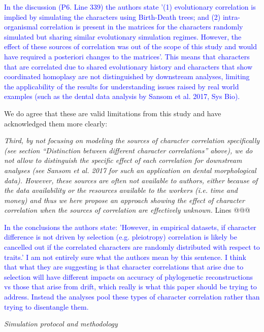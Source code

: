 \documentclass[12pt,letterpaper]{article}
\renewcommand{\subsection}[1]{%
\bigskip
\begin{center}
\begin{large}
\normalfont\itshape #1
\end{large}
\end{center}}
\begin{document}
\textcolor{blue}{In the discussion (P6. Line 339) the authors state '(1) evolutionary correlation is implied by simulating the characters using Birth-Death trees; and (2) intra-organismal correlation is present in the matrices for the characters randomly simulated but sharing similar evolutionary simulation regimes.  However, the effect of these sources of correlation was out of the scope of this study and would have required a posteriori changes to the matrices'. This means that characters that are correlated due to shared evolutionary history and characters that show coordinated homoplasy are not distinguished by downstream analyses, limiting the applicability of the results for understanding issues raised by real world examples (such as the dental data analysis by Sansom et al. 2017, Sys Bio).}

We do agree that these are valid limitations from this study and have acknowledged them more clearly:

\textit{Third, by not focusing on modeling the sources of character correlation specifically (see section “Distinction between different character correlations” above), we do not allow to distinguish the specific effect of each correlation for downstream analyses (see Sansom et al. 2017 for such an application on dental morphological data). However, these sources are often not available to authors, either because of the data availability or the resources available to the workers (i.e. time and money) and thus we here propose an approach showing the effect of character correlation when the sources of correlation are effectively unknown.} Lines @@@


\textcolor{blue}{In the conclusions the authors state: 'However, in empirical datasets, if character difference is not driven by selection (e.g. pleiotropy) correlation is likely be cancelled out if the correlated characters are randomly distributed with respect to traits.' I am not entirely sure what the authors mean by this sentence. I think that what they are suggesting is that character correlations that arise due to selection will have different impacts on accuracy of phylogenetic reconstructions vs those that arise from drift, which really is what this paper should be trying to address. Instead the analyses pool these types of character correlation rather than trying to disentangle them.}





\subsection{Simulation protocol and methodology}
\end{document}
